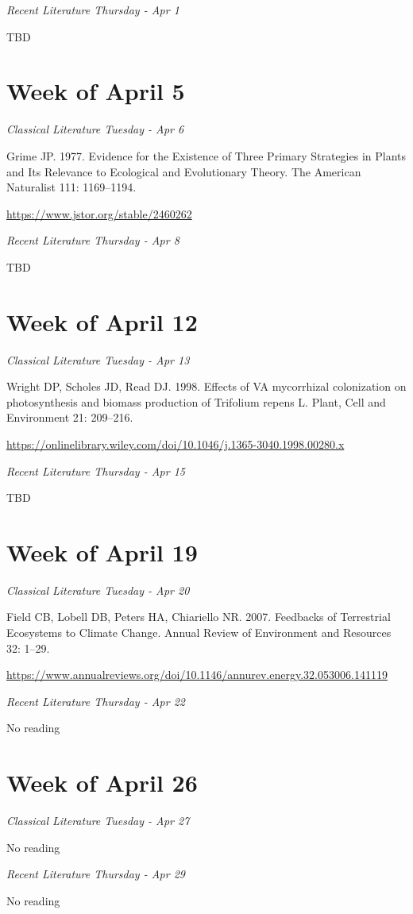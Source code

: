 \documentclass[12pt, notitlepage]{article}   	%
\begin{document}
{\textit{Recent Literature Thursday - Apr 1} \par
TBD

\section*{Week of April 5}
\textit{Classical Literature Tuesday - Apr 6} \par
Grime JP. 1977. Evidence for the Existence of Three Primary Strategies in Plants and Its 
Relevance to Ecological and Evolutionary Theory. 
The American Naturalist 111: 1169–1194. \par
\url{https://www.jstor.org/stable/2460262}

\textit{Recent Literature Thursday - Apr 8} \par
TBD

\section*{Week of April 12}
\textit{Classical Literature Tuesday - Apr 13} \par
Wright DP, Scholes JD, Read DJ. 1998. Effects of VA mycorrhizal colonization on 
photosynthesis and biomass production of Trifolium repens L. 
Plant, Cell and Environment 21: 209–216. \par
\url{https://onlinelibrary.wiley.com/doi/10.1046/j.1365-3040.1998.00280.x}

\textit{Recent Literature Thursday - Apr 15} \par
TBD

\section*{Week of April 19}
\textit{Classical Literature Tuesday - Apr 20} \par
Field CB, Lobell DB, Peters HA, Chiariello NR. 2007. Feedbacks of Terrestrial Ecosystems 
to Climate Change. Annual Review of Environment and Resources 32: 1–29. \par
\url{https://www.annualreviews.org/doi/10.1146/annurev.energy.32.053006.141119}

\textit{Recent Literature Thursday - Apr 22} \par
No reading \par

\section*{Week of April 26}
\textit{Classical Literature Tuesday - Apr 27} \par
No reading \par

\textit{Recent Literature Thursday - Apr 29} \par
No reading \par

} %
\end{document}
